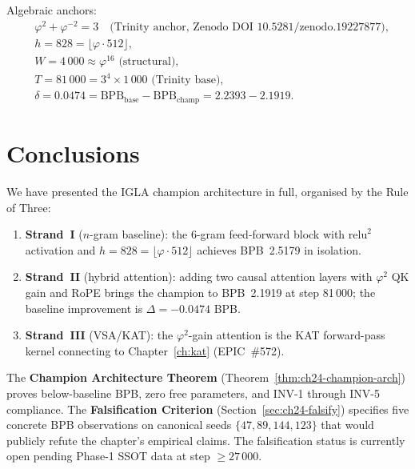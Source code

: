 Algebraic anchors:
\begin{align*}
  &\varphi^2 + \varphi^{-2} = 3 \quad \text{(Trinity anchor, Zenodo DOI 10.5281/zenodo.19227877)},\\
  &h = 828 = \lfloor \varphi \cdot 512 \rfloor,\\
  &W = 4\,000 \approx \varphi^{16} \text{ (structural)},\\
  &T = 81\,000 = 3^4 \times 1\,000 \text{ (Trinity base)},\\
  &\delta = 0.0474 = \mathrm{BPB}_{\text{base}} - \mathrm{BPB}_{\text{champ}}
         = 2.2393 - 2.1919.
\end{align*}

\section*{Conclusions}
\label{sec:ch24-conclusions}

We have presented the IGLA champion architecture in full, organised by the Rule
of Three:

\begin{enumerate}
  \item \textbf{Strand~I} ($n$-gram baseline): the 6-gram feed-forward block
        with $\mathrm{relu}^2$ activation and $h = 828 = \lfloor\varphi \cdot
        512\rfloor$ achieves BPB~2.5179 in isolation.
  \item \textbf{Strand~II} (hybrid attention): adding two causal attention
        layers with $\varphi^2$ QK gain and RoPE brings the champion to
        BPB~2.1919 at step 81\,000; the baseline improvement is $\Delta =
        -0.0474$ BPB.
  \item \textbf{Strand~III} (VSA/KAT): the $\varphi^2$-gain attention is the
        KAT forward-pass kernel connecting to Chapter~\ref{ch:kat} (EPIC~\#572).
\end{enumerate}

The \textbf{Champion Architecture Theorem}
(Theorem~\ref{thm:ch24-champion-arch}) proves below-baseline BPB, zero free
parameters, and INV-1 through INV-5 compliance.  The
\textbf{Falsification Criterion} (Section~\ref{sec:ch24-falsify}) specifies
five concrete BPB observations on canonical seeds $\{47, 89, 144, 123\}$ that
would publicly refute the chapter's empirical claims.  The falsification status
is currently open pending Phase-1 SSOT data at step $\geq 27\,000$.

